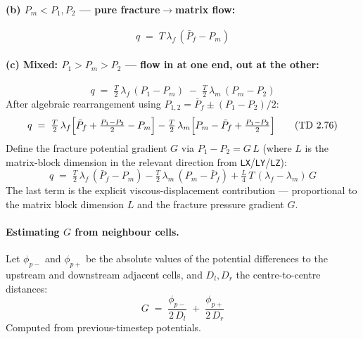 \documentclass[11pt,a4paper]{article}
\newcommand{\kw}[1]{\texttt{#1}}
\begin{document}
\paragraph{(b) $P_m < P_1, P_2$ — pure fracture$\to$matrix flow:}
\begin{equation}
q \;=\; T\,\lambda_f\,(\bar P_f - P_m)
\label{eq:visc-b}
\tag{TD 2.74}
\end{equation}

\paragraph{(c) Mixed: $P_1 > P_m > P_2$ — flow in at one end, out at the other:}
\begin{equation}
q \;=\; \tfrac{T}{2}\,\lambda_f\,(P_1 - P_m) \;-\; \tfrac{T}{2}\,\lambda_m\,(P_m - P_2)
\label{eq:visc-c1}
\tag{TD 2.75}
\end{equation}
After algebraic rearrangement using $P_{1,2} = \bar P_f \pm (P_1-P_2)/2$:
\begin{equation}
q \;=\; \tfrac{T}{2}\,\lambda_f\Bigl[\bar P_f + \tfrac{P_1-P_2}{2} - P_m\Bigr]
       - \tfrac{T}{2}\,\lambda_m\Bigl[P_m - \bar P_f + \tfrac{P_1-P_2}{2}\Bigr]
\label{eq:visc-c2}
\tag{TD 2.76}
\end{equation}
Define the fracture potential gradient $G$ via $P_1 - P_2 = G\,L$ (where $L$ is the matrix-block dimension in the relevant direction from \kw{LX}/\kw{LY}/\kw{LZ}):
\begin{equation}
\boxed{
q \;=\; \tfrac{T}{2}\,\lambda_f\,(\bar P_f - P_m)
       - \tfrac{T}{2}\,\lambda_m\,(P_m - \bar P_f)
       + \tfrac{L}{4}\,T\,(\lambda_f - \lambda_m)\,G
}
\label{eq:visc-final}
\tag{TD 2.77}
\end{equation}
The last term is the explicit viscous-displacement contribution — proportional to the matrix block dimension $L$ and the fracture pressure gradient $G$.

\paragraph{Estimating $G$ from neighbour cells.}
Let $\phi_{p-}$ and $\phi_{p+}$ be the absolute values of the potential differences to the upstream and downstream adjacent cells, and $D_l, D_r$ the centre-to-centre distances:
\begin{equation}
G \;=\; \frac{\phi_{p-}}{2\,D_l} \;+\; \frac{\phi_{p+}}{2\,D_r}
\label{eq:G-grad}
\tag{TD 2.78}
\end{equation}
Computed from previous-timestep potentials.
\end{document}
